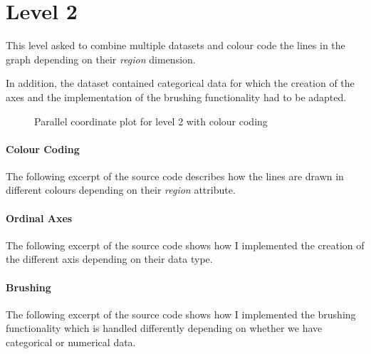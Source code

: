 \documentclass[]{article}
\begin{document}
\section*{Level 2}
This level asked to combine multiple datasets and colour code the lines in the graph depending on their \emph{region} dimension. 

In addition, the dataset contained categorical data for which the creation of the axes and the implementation of the brushing functionality had to be adapted.

\begin{figure}[t]
	
	\centering
	\caption{Parallel coordinate plot for level 2 with colour coding}
\end{figure}

\paragraph{Colour Coding} The following excerpt of the source code describes how the lines are drawn in different colours depending on their \emph{region} attribute. 

\paragraph{Ordinal Axes} The following excerpt of the source code shows how I implemented the creation of the different axis depending on their data type. 


\paragraph{Brushing} The following excerpt of the source code shows how I implemented the brushing functionality which is handled differently depending on whether we have categorical or numerical data. 
\end{document}
